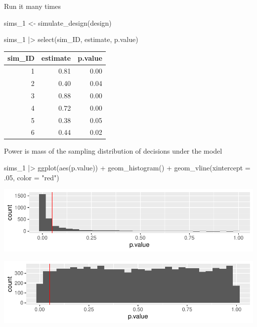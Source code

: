 \documentclass[
  11pt,
  ignorenonframetext,
]{beamer}
\newenvironment{Shaded}{\begin{snugshade}}{\end{snugshade}}
\newcommand{\AttributeTok}[1]{\textcolor[rgb]{0.40,0.45,0.13}{#1}}
\newcommand{\DecValTok}[1]{\textcolor[rgb]{0.68,0.00,0.00}{#1}}
\newcommand{\FunctionTok}[1]{\textcolor[rgb]{0.28,0.35,0.67}{#1}}
\newcommand{\NormalTok}[1]{\textcolor[rgb]{0.00,0.23,0.31}{#1}}
\newcommand{\OtherTok}[1]{\textcolor[rgb]{0.00,0.23,0.31}{#1}}
\newcommand{\SpecialCharTok}[1]{\textcolor[rgb]{0.37,0.37,0.37}{#1}}
\newcommand{\StringTok}[1]{\textcolor[rgb]{0.13,0.47,0.30}{#1}}
\begin{document}
\begin{frame}[fragile]{Run it many times}
\protect\hypertarget{run-it-many-times}{}
\begin{Shaded}
\begin{Highlighting}[]
\NormalTok{sims\_1 }\OtherTok{\textless{}{-}} \FunctionTok{simulate\_design}\NormalTok{(design) }

\NormalTok{sims\_1 }\SpecialCharTok{|\textgreater{}} \FunctionTok{select}\NormalTok{(sim\_ID, estimate, p.value)}
\end{Highlighting}
\end{Shaded}

\begin{tabular}{r|r|r}
\hline
sim\_ID & estimate & p.value\\
\hline
1 & 0.81 & 0.00\\
\hline
2 & 0.40 & 0.04\\
\hline
3 & 0.88 & 0.00\\
\hline
4 & 0.72 & 0.00\\
\hline
5 & 0.38 & 0.05\\
\hline
6 & 0.44 & 0.02\\
\hline
\end{tabular}
\end{frame}

\begin{frame}[fragile]{Power is mass of the sampling distribution of
decisions under the model}
\protect\hypertarget{power-is-mass-of-the-sampling-distribution-of-decisions-under-the-model}{}
\begin{Shaded}
\begin{Highlighting}[]
\NormalTok{sims\_1 }\SpecialCharTok{|\textgreater{}}
  \FunctionTok{ggplot}\NormalTok{(}\FunctionTok{aes}\NormalTok{(p.value)) }\SpecialCharTok{+} 
  \FunctionTok{geom\_histogram}\NormalTok{() }\SpecialCharTok{+}
  \FunctionTok{geom\_vline}\NormalTok{(}\AttributeTok{xintercept =}\NormalTok{ .}\DecValTok{05}\NormalTok{, }\AttributeTok{color =} \StringTok{"red"}\NormalTok{)}
\end{Highlighting}
\end{Shaded}

\includegraphics{0_lectures_files/figure-beamer/unnamed-chunk-89-1.pdf}

\includegraphics{0_lectures_files/figure-beamer/unnamed-chunk-91-1.pdf}
\end{frame}
\end{document}
